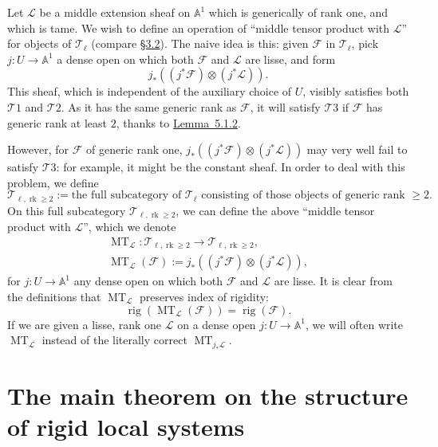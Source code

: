 Let \(\mathcal{L}\) be a middle extension sheaf on \(\mathbb{A}^1\) which is
generically of rank one, and which is tame. We wish to define an operation of
``middle tensor product with \(\mathcal{L}\)'' for objects of
\(\mathcal{T}_\ell\) (compare \hyperref[sec:3.2]{\S3.2}). The naive idea is
this: given \(\mathcal{F}\) in \(\mathcal{T}_\ell\), pick
\(j:U\to\mathbb{A}^1\) a dense open on which both \(\mathcal{F}\) and
\(\mathcal{L}\) are lisse, and form
\[
  j_*((j^*\mathcal{F})\otimes(j^*\mathcal{L})).
\]
This sheaf, which is independent of the auxiliary choice of \(U\), visibly
satisfies both \(\mathcal{T}1\) and \(\mathcal{T}2\). As it has the same
generic rank as \(\mathcal{F}\), it will satisfy \(\mathcal{T}3\) if
\(\mathcal{F}\) has generic rank at least \(2\), thanks to
\hyperref[lem:5.1.2]{Lemma~5.1.2}.

However, for \(\mathcal{F}\) of generic rank one,
\(j_*((j^*\mathcal{F})\otimes(j^*\mathcal{L}))\) may very well fail to satisfy
\(\mathcal{T}3\): for example, it might be the constant sheaf. In order to deal
with this problem, we define
\[
  \mathcal{T}_{\ell,\operatorname{rk}\geq 2}:=
  \text{the full subcategory of \(\mathcal{T}_\ell\) consisting of those
  objects of generic rank \(\geq 2\)}.
\]
On this full subcategory \(\mathcal{T}_{\ell,\operatorname{rk}\geq 2}\), we can
define the above ``middle tensor product with \(\mathcal{L}\)'', which we denote
\[
\begin{aligned}
  \operatorname{MT}_{\mathcal{L}}:
  \mathcal{T}_{\ell,\operatorname{rk}\geq 2}\to
  \mathcal{T}_{\ell,\operatorname{rk}\geq 2},\\
  \operatorname{MT}_{\mathcal{L}}(\mathcal{F}):=
  j_*((j^*\mathcal{F})\otimes(j^*\mathcal{L})),
\end{aligned}
\]
for \(j:U\to\mathbb{A}^1\) any dense open on which both \(\mathcal{F}\) and
\(\mathcal{L}\) are lisse. It is clear from the definitions that
\(\operatorname{MT}_{\mathcal{L}}\) preserves index of rigidity:
\[
  \operatorname{rig}(\operatorname{MT}_{\mathcal{L}}(\mathcal{F}))
  =\operatorname{rig}(\mathcal{F}).
\]
If we are given a lisse, rank one \(\mathcal{L}\) on a dense open
\(j:U\to\mathbb{A}^1\), we will often write \(\operatorname{MT}_{\mathcal{L}}\)
instead of the literally correct \(\operatorname{MT}_{j_*\mathcal{L}}\).

\section{The main theorem on the structure of rigid local systems}\label{sec:5.2}

